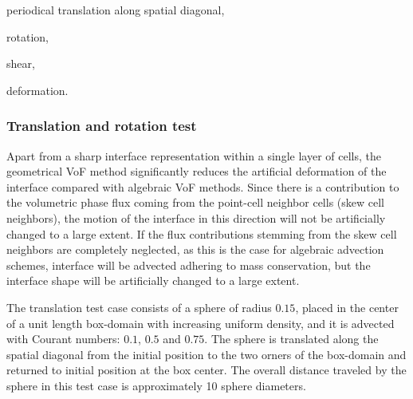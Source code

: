 \begin{compactitem}
   \item periodical translation along spatial diagonal,  
   \item rotation,  
   \item shear,  
   \item deformation. 
\end{compactitem} 




\subsubsection{Translation and rotation test}

Apart from a sharp interface representation within a single layer of cells, the
geometrical VoF method significantly reduces the artificial deformation of the
interface compared with algebraic VoF methods. Since there is a contribution to 
the volumetric phase flux coming from the point-cell neighbor cells (skew cell 
neighbors), the motion of the interface in this direction will not be artificially 
changed to a large extent. If the flux contributions stemming from the skew cell 
neighbors are completely neglected, as this is the case for algebraic advection 
schemes,  interface will be advected adhering to mass conservation, but the 
interface shape will be artificially changed to a large extent. 

The translation test case consists of a sphere of radius $0.15$, placed in the
center of a unit length box-domain with increasing uniform density, and it is
advected with Courant numbers: $0.1$, $0.5$ and $0.75$. The sphere is
translated along the spatial diagonal from the initial position to the two
orners of the box-domain and returned to initial position at the box center.
The overall distance traveled by the sphere in this test case is approximately 10
sphere diameters.  

